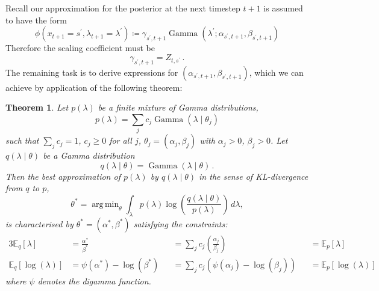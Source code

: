 \documentclass[twoside, 11pt]{article}
\DeclareMathOperator*{\argmin}{arg\,min}
\DeclareMathOperator*{\gammad}{Gamma}
\newcommand{\E}[0] {\mathbb{E}} %
\newtheorem{thm}{Theorem}
\begin{document}
Recall our approximation for the posterior at the next timestep $t+1$ is assumed to have the form
\begin{equation}
\phi(x_{t+1}=s^{\prime}, \lambda_{t+1}=\lambda^{\prime}) \coloneqq \gamma_{s^{\prime},t+1} \gammad(\lambda^{\prime} ; \alpha_{s^{\prime},t+1}, \beta_{s^{\prime},t+1})
\end{equation}
Therefore the scaling coefficient must be
\begin{equation}
\gamma_{s^{\prime},t+1} = Z_{t,s^{\prime}} \, .
\end{equation}
The remaining task is to derive expressions for $(\alpha_{s^{\prime},t+1}, \beta_{s^{\prime},t+1})$, which we can achieve by application of the following theorem:

\begin{thm}
Let $p(\lambda)$ be a finite mixture of Gamma distributions,
\begin{equation}
p(\lambda) = \sum_j c_j \gammad(\lambda \mid \theta_j)
\end{equation}
such that $\sum_j c_j = 1$, $c_j \geq 0$ for all $j$, $\theta_j = (\alpha_j, \beta_j)$ with $\alpha_j > 0$, $\beta_j > 0$.
Let $q(\lambda \mid \theta)$ be a Gamma distribution
\begin{equation}
q(\lambda \mid \theta ) = \gammad(\lambda \mid \theta) \, .
\end{equation}
Then the best approximation of $p(\lambda)$ by $q(\lambda \mid \theta)$ in the sense of KL-divergence from $q$ to $p$,
\begin{equation}
\theta^{*} = \argmin_{\theta} \int_{\lambda} p(\lambda) \log \left( \frac{q(\lambda \mid \theta) }{ p(\lambda) } \right) \, d\lambda ,
\end{equation}
is characterised by $\theta^* = (\alpha^*, \beta^*)$ satisfying the constraints:
\begin{alignat}{3}
\E_q \left[ \lambda \right]
& = \frac{\alpha^*}{\beta^*}
&& = \sum_j c_j \left( \frac{\alpha_j}{\beta_j} \right)
&& = \E_p \left[ \lambda \right] \\
\E_q \left[ \log(\lambda) \right]
& = \psi(\alpha^*) - \log(\beta^*)
&& = \sum_j c_j \left( \psi(\alpha_j) - \log(\beta_j) \right)
&& = \E_p \left[ \log(\lambda) \right]
\end{alignat}
where $\psi$ denotes the digamma function.

\end{thm}
\end{document}
